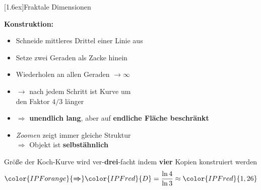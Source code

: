 \documentclass[final]{beamer}
\newlength{\columnheight}
\newlength{\marginw}
\newlength{\tw}
\newlength{\colw}
\newenvironment{myTwoColPoster}{%
  \begin{minipage}[t]{\textwidth}%
    \hspace*{\marginw}%
    \hspace*{9.5bp}%
    \begin{minipage}[t]{\tw}}%
  {\end{minipage}%
   \hspace*{\marginw}%
   \end{minipage}}
\newenvironment{myCol}%
    {\begin{minipage}[t][\columnheight][t]{\colw}}%
    {\end{minipage}}
\newenvironment{textblock}[1]%
    {\begin{block}{\rule[-0.6ex]{0pt}{2.4ex}\raisebox{-0.25ex}[1.6ex]{#1}}%
     \vspace*{5mm}}%
    {\vspace*{5mm}\end{block}}
\begin{document}
\begin{frame}[t]{}
\begin{myTwoColPoster}
\begin{myCol}
\begin{textblock}{Fraktale Dimensionen}
\begin{minipage}[t]{0.38\textwidth}
\begin{center}
    \end{center}
  \end{minipage}\hfill
  \begin{minipage}[t]{0.58\textwidth}
    \vspace*{1.5cm}
    \textbf{ Konstruktion:}
    \begin{itemize} \setlength\itemsep{1.1em} \Large
      \item Schneide mittleres Drittel einer Linie aus
      \item Setze zwei Geraden als Zacke hinein
      \item Wiederholen an allen Geraden $\to\infty$
      \item \textcolor{IPForange}{$\rightarrow$} nach jedem Schritt ist Kurve um\\
      den Faktor $4/3$ l\"anger
      \item \textcolor{IPForange}{$\Rightarrow$} \textbf{unendlich lang}, aber auf \textbf{endliche Fläche beschränkt}
      \item \textit{Zoomen} zeigt immer gleiche Struktur\\[1.2em]
      \textcolor{IPForange}{\textbf{$\Rightarrow$}} Objekt ist \textcolor{IPForange}{\textbf{ selbst\"ahnlich}}
    \end{itemize}
    Gr\"o\ss e der Koch-Kurve wird ver-\textcolor{IPForange}{\textbf{drei}}-facht indem \textcolor{IPForange}{\textbf{vier}} Kopien konstruiert werden
    \begin{align*}
      {\color{IPForange}{\boldsymbol{\Rightarrow}}} {\color{IPFred}{ D }} =\frac{\ln 4}{\ln 3}\approx  \color{IPFred}{1,26}
    \end{align*}
  \end{minipage}


\end{textblock}
\end{myCol}
\end{myTwoColPoster}
\end{frame}
\end{document}
